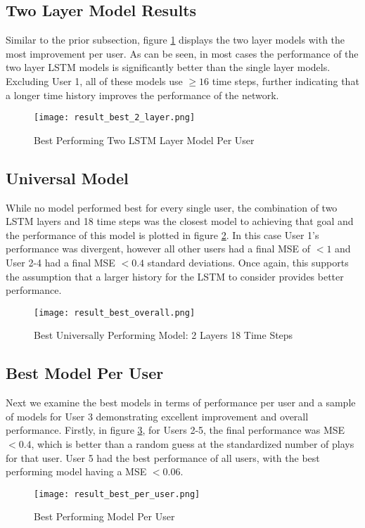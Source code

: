     \subsection{Two Layer Model Results}
    Similar to the prior subsection, figure \ref{fig:results-2-layer} displays the two layer models with the most improvement per user. As can be seen, in most cases the performance of the two layer LSTM models is significantly better than the single layer models. Excluding User 1, all of these models use $\geq 16$ time steps, further indicating that a longer time history improves the performance of the network.
        \begin{figure}
            \texttt{[image: result\_best\_2\_layer.png]}
            \caption{Best Performing Two LSTM Layer Model Per User}
            \label{fig:results-2-layer}
        \end{figure}
        
    \subsection{Universal Model}
    While no model performed best for every single user, the combination of two LSTM layers and 18 time steps was the closest model to achieving that goal and the performance of this model is plotted in figure \ref{fig:results-overall}. In this case User 1's performance was divergent, however all other users had a final MSE of $<1$ and User 2-4 had a final MSE $<0.4$ standard deviations. Once again, this supports the assumption that a larger history for the LSTM to consider provides better performance.
        \begin{figure}
            \texttt{[image: result\_best\_overall.png]}
            \caption{Best Universally Performing Model: 2 Layers 18 Time Steps}
            \label{fig:results-overall}
        \end{figure}
      
    \subsection{Best Model Per User}
    Next we examine the best models in terms of performance per user and a sample of models for User 3 demonstrating excellent improvement and overall performance. Firstly, in figure \ref{fig:results-best-per-user}, for Users 2-5, the final performance was MSE $<0.4$, which is better than a random guess at the standardized number of plays for that user. User 5 had the best performance of all users, with the best performing model having a MSE $<0.06$.
        \begin{figure}
            \texttt{[image: result\_best\_per\_user.png]}
            \caption{Best Performing Model Per User}
            \label{fig:results-best-per-user}
        \end{figure}
        

